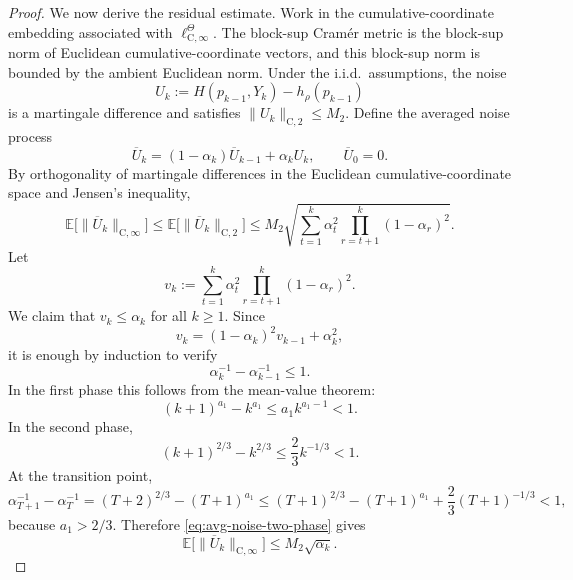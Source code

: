 \documentclass{article}
\newcommand{\E}{\mathbb{E}}
\begin{document}
\begin{proof}
We now derive the residual estimate. Work in the cumulative-coordinate embedding associated with $\ell^\Theta_{\mathrm C,\infty}$. The block-sup Cram\'er metric is the block-sup norm of Euclidean cumulative-coordinate vectors, and this block-sup norm is bounded by the ambient Euclidean norm. Under the i.i.d.\ assumptions, the noise
\begin{equation}
U_k:=H(p_{k-1},Y_k)-h_\rho(p_{k-1})
\end{equation}
is a martingale difference and satisfies $\|U_k\|_{\mathrm C,2}\le M_2$. Define the averaged noise process
\begin{equation}
\overline U_k=(1-\alpha_k)\overline U_{k-1}+\alpha_k U_k,\qquad \overline U_0=0.
\end{equation}
By orthogonality of martingale differences in the Euclidean cumulative-coordinate space and Jensen's inequality,
\begin{equation}\label{eq:avg-noise-two-phase}
\E\bigl[\|\overline U_k\|_{\mathrm C,\infty}\bigr]\le \E\bigl[\|\overline U_k\|_{\mathrm C,2}\bigr] \le M_2\sqrt{\sum_{t=1}^k\alpha_t^2\prod_{r=t+1}^k(1-\alpha_r)^2}.
\end{equation}
Let
\begin{equation}
v_k:=\sum_{t=1}^k\alpha_t^2\prod_{r=t+1}^k(1-\alpha_r)^2.
\end{equation}
We claim that $v_k\le \alpha_k$ for all $k\ge1$. Since
\begin{equation}
v_k=(1-\alpha_k)^2v_{k-1}+\alpha_k^2,
\end{equation}
it is enough by induction to verify
\begin{equation}
\alpha_k^{-1}-\alpha_{k-1}^{-1}\le1.
\end{equation}
In the first phase this follows from the mean-value theorem:
\begin{equation}
(k+1)^{a_1}-k^{a_1}\le a_1 k^{a_1-1}<1.
\end{equation}
In the second phase,
\begin{equation}
(k+1)^{2/3}-k^{2/3}\le \frac23 k^{-1/3}<1.
\end{equation}
At the transition point,
\begin{equation}
\alpha_{T+1}^{-1}-\alpha_T^{-1} =(T+2)^{2/3}-(T+1)^{a_1} \le (T+1)^{2/3}-(T+1)^{a_1}+\frac23(T+1)^{-1/3}<1,
\end{equation}
because $a_1>2/3$. Therefore \eqref{eq:avg-noise-two-phase} gives
\begin{equation}\label{eq:avg-noise-final-two-phase}
\E\bigl[\|\overline U_k\|_{\mathrm C,\infty}\bigr]\le M_2\sqrt{\alpha_k}.
\end{equation}


\end{proof}
\end{document}
